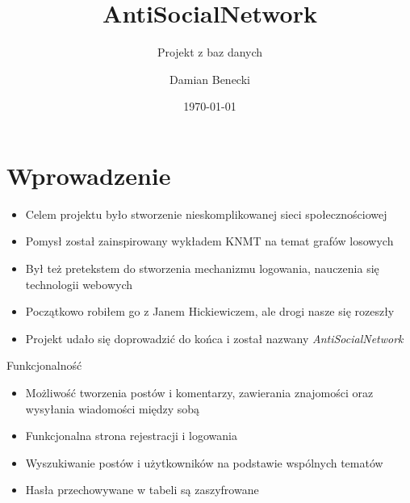 \documentclass[handout]{beamer}
\title{AntiSocialNetwork}
\subtitle{Projekt z baz danych}
\author[D. Benecki]{Damian Benecki}
\institute{Uniwersytet Wrocławski}
\date{\today}
\begin{document}
        \maketitle
        \begin{frame}
            \tableofcontents
        \end{frame}
    \section{Wprowadzenie}
        \begin{frame}
            \begin{itemize}
                \item Celem projektu było stworzenie nieskomplikowanej sieci społecznościowej \pause
                \item Pomysł został zainspirowany wykładem KNMT na temat grafów losowych \pause
                \item Był też pretekstem do stworzenia mechanizmu logowania, nauczenia się technologii webowych \pause
                \item Początkowo robiłem go z Janem Hickiewiczem, ale drogi nasze się rozeszły \pause
                \item Projekt udało się doprowadzić do końca i został nazwany \textit{AntiSocialNetwork}
            \end{itemize}
        \end{frame}
        \begin{frame}{Funkcjonalność}
            \begin{itemize}
                \item Możliwość tworzenia postów i komentarzy, zawierania znajomości oraz wysyłania wiadomości między sobą \pause
                \item Funkcjonalna strona rejestracji i logowania \pause
                \item Wyszukiwanie postów i użytkowników na podstawie wspólnych tematów \pause
                \item Hasła przechowywane w tabeli są zaszyfrowane
            \end{itemize}
        \end{frame}
\end{document}
